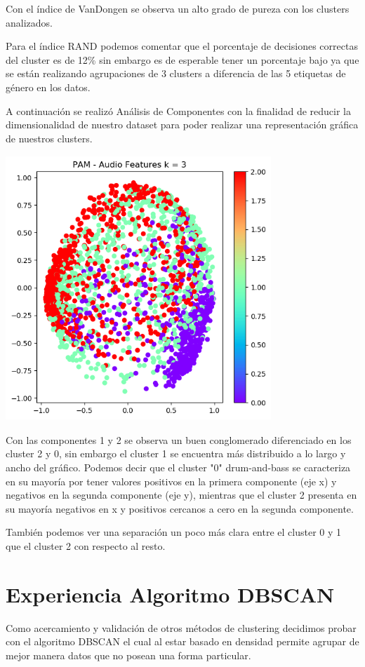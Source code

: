 \documentclass{icisfinal}
\begin{document}
Con el índice de VanDongen se observa un alto grado de pureza con los clusters analizados.

Para el índice RAND podemos comentar que el porcentaje de decisiones correctas del cluster es de 12\% sin embargo es de esperable tener un porcentaje bajo ya que se están realizando agrupaciones de 3 clusters a diferencia de las 5 etiquetas de género en los datos.

A continuación se realizó Análisis de Componentes con la finalidad de reducir la dimensionalidad de nuestro dataset para poder realizar una representación gráfica de nuestros clusters.

\includegraphics[width=10cm, height=10cm]{img/imagenes/7PAM_pcaV2}

Con las componentes 1 y 2 se observa un buen conglomerado diferenciado en los cluster 2 y 0, sin embargo el cluster 1 se encuentra más distribuido a lo largo y ancho del gráfico. Podemos decir que el cluster "0" drum-and-bass se caracteriza en su mayoría por tener valores positivos en la primera componente (eje x) y negativos en la segunda componente (eje y), mientras que el cluster 2 presenta en su mayoría negativos en x y positivos cercanos a cero en la segunda componente.    

También podemos ver una separación un poco más clara entre el cluster 0 y 1 que el cluster 2 con respecto al resto.

\newpage
\section{Experiencia Algoritmo DBSCAN}
Como acercamiento y validación de otros métodos de clustering decidimos probar con el algoritmo DBSCAN el cual al estar basado en densidad permite agrupar de mejor manera datos que no posean una forma particular.
\end{document}
